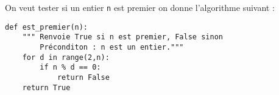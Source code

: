 \exer{}
\setcounter{numques}{0}



On veut tester si un entier \texttt{n} est premier on donne l'algorithme suivant :




\begin{lstlisting}
def est_premier(n):
    """ Renvoie True si n est premier, False sinon
        Préconditon : n est un entier."""
    for d in range(2,n):
        if n % d == 0:
            return False
    return True
\end{lstlisting}

